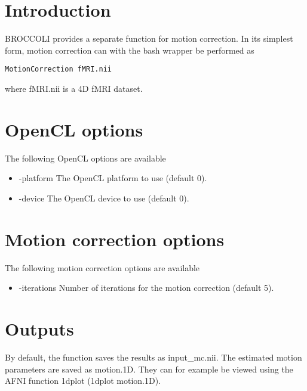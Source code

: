 \section{Introduction}

BROCCOLI provides a separate function for motion correction. In its simplest form, motion correction can with the bash wrapper be performed as

\begin{verbatim}
MotionCorrection fMRI.nii
\end{verbatim}
where fMRI.nii is a 4D fMRI dataset.

\section{OpenCL options}

The following OpenCL options are available

\begin{itemize}

\item -platform
\newline \newline The OpenCL platform to use (default 0).

\item -device
\newline \newline The OpenCL device to use (default 0).

\end{itemize}

\section{Motion correction options}

The following motion correction options are available

\begin{itemize}

\item -iterations  
\newline \newline Number of iterations for the motion correction (default 5). 

\end{itemize}

\section{Outputs}

By default, the function saves the results as input\_mc.nii. The estimated motion parameters are saved as motion.1D. They can for example be viewed using the AFNI function 1dplot (1dplot motion.1D).

